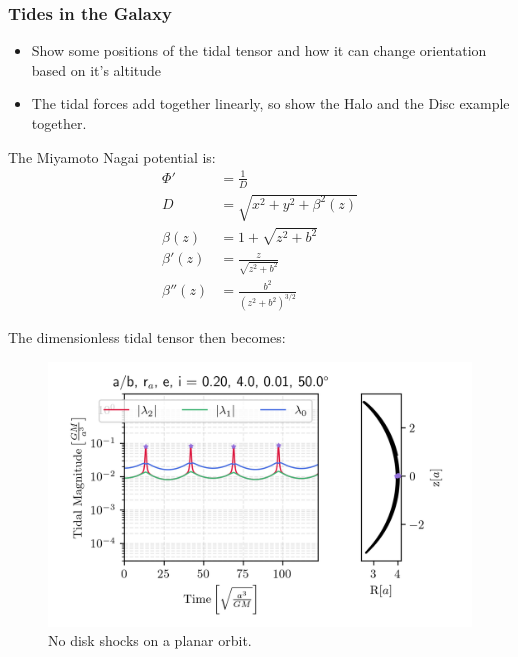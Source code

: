         \subsubsection*{Tides in the Galaxy}
            \begin{itemize}
                \item Show some positions of the tidal tensor and how it can change orientation based on it's altitude 
                \item The tidal forces add together linearly, so show the Halo and the Disc example together. 
            \end{itemize}

            The Miyamoto Nagai potential is: 
            \begin{eqnarray}
                \Phi'   &= \frac{1}{D}\\
                D       &= \sqrt{x^2 + y^2 + \beta^2(z)}\\
                \beta(z)   &= 1 + \sqrt{z^2 + b^2}\\
                \beta'(z) &= \frac{z}{\sqrt{z^2 + b^2}}\\
                \beta''(z)  &= \frac{b^2}{\left(z^2 + b^2\right)^{3/2}}
            \end{eqnarray}

            The dimensionless tidal tensor then becomes: 


            \begin{figure}
                \includegraphics[width=\linewidth]{images/miyamoto_disc_shocks_ab_rp_e_i_0.20_4.0_0.01_50.0.png}
                \caption{No disk shocks on a planar orbit.}
                \label{fig:miyamoto_disc_shocks_circular_inclined_orbit}
            \end{figure}



